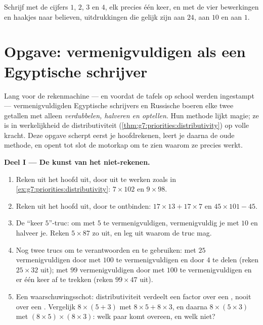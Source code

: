 \begin{exercise}[$\star\star\star$]\label{exo:g7:priorities:11}
Schrijf met de cijfers $1$, $2$, $3$ en $4$, elk precies één keer, en met de vier
bewerkingen en haakjes naar believen, uitdrukkingen die gelijk zijn aan $24$, aan
$10$ en aan $1$.
\end{exercise}

\section{Opgave: vermenigvuldigen als een Egyptische schrijver}

\begin{problem}
\label{pb:g7:priorities:1}
Lang voor de rekenmachine --- en voordat de tafels op school werden ingestampt
--- vermenigvuldigden Egyptische schrijvers en Russische boeren elke twee
getallen met alleen \emph{verdubbelen, halveren en optellen}. Hun methode lijkt
magie; ze is in werkelijkheid de distributiviteit
(\cref{thm:g7:priorities:distributivity}) op volle kracht. Deze opgave scherpt
eerst je hoofdrekenen, leert je daarna de oude methode, en opent tot slot de
motorkap om te zien waarom ze precies werkt.

\medskip
\noindent\textbf{Deel I --- De kunst van het niet-rekenen.}
\begin{enumerate}
  \item Reken uit het hoofd uit, door uit te werken zoals in
        \cref{ex:g7:priorities:distributivity}: $7 \times 102$ en
        $9 \times 98$.
  \item Reken uit het hoofd uit, door te ontbinden:
        $17 \times 13 + 17 \times 7$ en $45 \times 101 - 45$.
  \item De ``keer $5$''-truc: om met $5$ te vermenigvuldigen, vermenigvuldig je
        met $10$ en halveer je. Reken $5 \times 87$ zo uit, en leg uit waarom de
        truc mag.
  \item Nog twee trucs om te verantwoorden en te gebruiken: met $25$
        vermenigvuldigen door met $100$ te vermenigvuldigen en door $4$ te delen
        (reken $25 \times 32$ uit); met $99$ vermenigvuldigen door met $100$ te
        vermenigvuldigen en er één keer af te trekken (reken $99 \times 47$
        uit).
  \item Een waarschuwingsschot: distributiviteit verdeelt een factor over een
        \emph{}, nooit over een \emph{}. Vergelijk $8 \times (5 + 3)$
        met $8 \times 5 + 8 \times 3$, en daarna $8 \times (5 \times 3)$ met
        $(8 \times 5) \times (8 \times 3)$: welk paar komt overeen, en welk
        niet?
\end{enumerate}


\end{problem}
